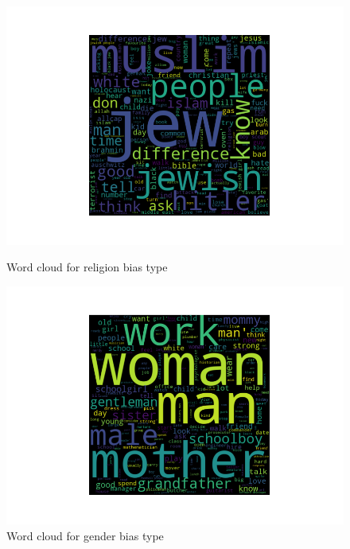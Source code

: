 \begin{figure}
\centering
\begin{minipage}{.5\textwidth}
  \centering
    \includegraphics[width=1\textwidth]{thesis/figures/religion.png}
    \caption{Word cloud for religion bias type}
  \label{fig:test1}
\end{minipage}%
\begin{minipage}{.5\textwidth}
  \centering
    \includegraphics[width=1\textwidth]{thesis/figures/gender.png}
    \caption{Word cloud  for gender bias type}
  \label{fig:test2}
\end{minipage}
\end{figure}

\pagebreak



